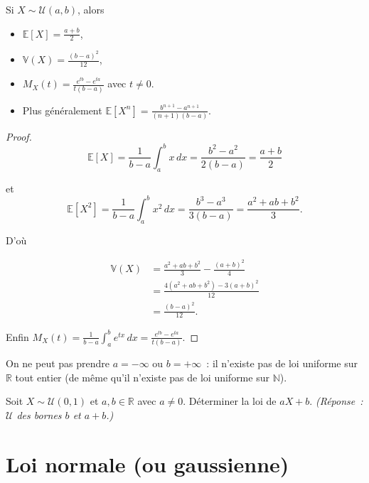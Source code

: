 \begin{mdframed}
\begin{proposition}
\label{prop:unifc-moments}
Si $X\sim\mathcal{U}(a,b)$, alors

\begin{itemize}
\item $\mathbb{E}[X]=\frac{a+b}{2}$,
\item $\mathbb{V}(X)=\frac{(b-a)^2}{12}$,
\item $M_X(t)=\frac{e^{tb}-e^{ta}}{t(b-a)}$ avec $t\ne0$.
\item Plus généralement $\displaystyle\mathbb{E}[X^n]=\frac{b^{n+1}-a^{n+1}}{(n+1)(b-a)}$.
\end{itemize}
\end{proposition}
\end{mdframed}

\begin{proof}
$$
\mathbb{E}[X]=\frac1{b-a}\int_a^b x\,dx=\frac{b^2-a^2}{2(b-a)}=\frac{a+b}{2}
$$ 

et
$$
\mathbb{E}[X^2]=\frac1{b-a}\int_a^b x^2\,dx=\frac{b^3-a^3}{3(b-a)}
=\frac{a^2+ab+b^2}{3}. 
$$

D'où

\begin{align*}
  \mathbb{V}(X)&=\frac{a^2+ab+b^2}{3}-\frac{(a+b)^2}{4} \\
  &=\frac{4(a^2+ab+b^2)-3(a+b)^2}{12} \\
&=\frac{(b-a)^2}{12}.
\end{align*}

Enfin $M_X(t)=\frac1{b-a}\int_a^b e^{tx}\,dx=\frac{e^{tb}-e^{ta}}{t(b-a)}$.
\end{proof}

\begin{remarque}
On ne peut pas prendre $a=-\infty$ ou $b=+\infty$~: il n'existe pas de loi
uniforme sur $\mathbb{R}$ tout entier (de même qu'il n'existe pas de loi uniforme sur
$\mathbb{N}$).
\end{remarque}

\begin{exercice}
\label{ex:unif-affine}
Soit $X\sim\mathcal{U}(0,1)$ et $a,b\in\mathbb{R}$ avec $a\ne0$. Déterminer la loi de
$aX+b$. \emph{(Réponse~: $\mathcal{U}$ des bornes $b$ et $a+b$.)}
\end{exercice}

\newpage
\section{Loi normale (ou gaussienne)}

